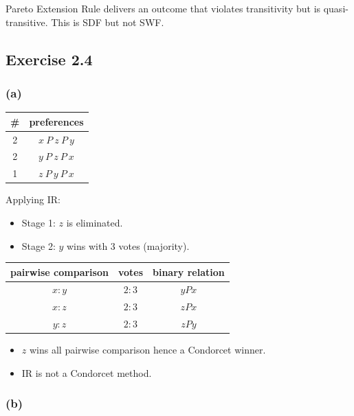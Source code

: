 \documentclass[a4paper]{article}
\begin{document}
Pareto Extension Rule delivers an outcome that violates transitivity but is quasi-transitive. This is SDF but not SWF.

\subsection*{Exercise 2.4}

\subsubsection*{(a)}

\begin{table}[!htbp]
    \centering
    \begin{tabular}{c|c|}
        \# & preferences         \\ 
        \hline
        2  & $x\: P\: z\: P\: y$ \\
        2  & $y\: P\: z\: P\: x$ \\
        1  & $z\: P\: y\: P\: x$ \\
        \hline
    \end{tabular}
\end{table}

Applying IR:
\begin{itemize}
    \item Stage 1: $z$ is eliminated.
    \item Stage 2: $y$ wins with 3 votes (majority).
\end{itemize}

\begin{table}[!htbp]
    \centering
    \begin{tabular}{ccc}
        pairwise comparison & votes  & binary relation \\
        \hline 
        $x:y$  & $2:3$  & $yPx$           \\
        $x:z$  & $2:3$  & $zPx$           \\
        $y:z$  & $2:3$  & $zPy$           \\
        \hline
    \end{tabular}
\end{table}

\begin{itemize}
    \item $z$ wins all pairwise comparison hence a Condorcet winner.
    \item IR is not a Condorcet method.
\end{itemize}

\subsubsection*{(b)}
\end{document}
